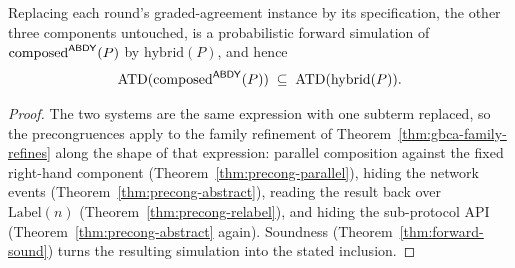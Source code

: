 \begin{theorem}[Substitution]
  \label{thm:aba-substitution}
  \leanok
  Replacing each round's graded-agreement instance by its specification, the other three components untouched, is a probabilistic forward simulation of $\mathrm{composed}^{\mathsf{ABDY}}(P)$ by $\mathrm{hybrid}(P)$, and hence
  \[
    \operatorname{ATD}(\mathrm{composed}^{\mathsf{ABDY}}(P)) \;\subseteq\;
    \operatorname{ATD}(\mathrm{hybrid}(P)).
  \]
\end{theorem}

\begin{proof}\leanok
  The two systems are the same expression with one subterm replaced, so the precongruences apply to the family refinement of Theorem~\ref{thm:gbca-family-refines} along the shape of that expression: parallel composition against the fixed right-hand component (Theorem~\ref{thm:precong-parallel}), hiding the network events (Theorem~\ref{thm:precong-abstract}), reading the result back over $\mathrm{Label}(n)$ (Theorem~\ref{thm:precong-relabel}), and hiding the sub-protocol API (Theorem~\ref{thm:precong-abstract} again).
  Soundness (Theorem~\ref{thm:forward-sound}) turns the resulting simulation into the stated inclusion.
\end{proof}
